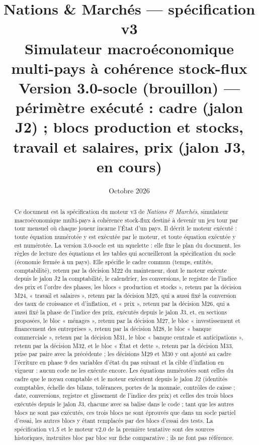 \documentclass[11pt,a4paper]{article}
\title{\textbf{Nations \& Marchés --- spécification v3}\\[4pt]
\large Simulateur macroéconomique multi-pays à cohérence stock-flux\\[2pt]
\normalsize Version 3.0-socle (brouillon) --- périmètre exécuté : cadre (jalon J2) ; blocs production et stocks, travail et salaires, prix (jalon J3, en cours)}
\author{}
\date{Octobre 2026}
\begin{document}
\maketitle

\begin{abstract}
\noindent Ce document est la spécification du moteur v3 de \emph{Nations \& Marchés}, simulateur macroéconomique multi-pays à cohérence stock-flux destiné à devenir un jeu tour par tour mensuel où chaque joueur incarne l'État d'un pays. Il décrit le moteur exécuté : toute équation numérotée y est exécutée par le moteur, et toute équation exécutée y est numérotée. La version 3.0-socle est un squelette : elle fixe le plan du document, les règles de lecture des équations et les tables qui accueilleront la spécification du socle (économie fermée à un pays). Elle spécifie le cadre commun (temps, entités, comptabilité), retenu par la décision M22 du mainteneur, dont le moteur exécute depuis le jalon J2 la comptabilité, le calendrier, les conversions, le registre de l'indice des prix et l'ordre des phases, les blocs « production et stocks », retenu par la décision M24, « travail et salaires », retenu par la décision M25, qui a aussi fixé la conversion des taux de croissance et d'inflation, et « prix », retenu par la décision M26, qui a aussi fixé la phase de l'indice des prix, exécutés depuis le jalon J3, et, en sections proposées, le bloc « ménages », retenu par la décision M27, le bloc « investissement et financement des entreprises », retenu par la décision M28, le bloc « banque commerciale », retenu par la décision M31, le bloc « banque centrale et anticipations », retenu par la décision M32, et le bloc « État et dette », retenu par la décision M33, prise par paire avec la précédente ; les décisions M29 et M30 y ont ajouté au cadre l'écriture en phase 9 des variables d'état du pas suivant et la cible d'inflation en vigueur : aucun code ne les exécute encore. Les équations numérotées sont celles du cadre que le noyau comptable et le moteur exécutent depuis le jalon J2 (identités comptables, échelle des bilans, tolérances, portes de la monnaie, contrôles de caisse ; date, conversions, registre et glissement de l'indice des prix) et celles des trois blocs exécutés depuis le jalon J3, chacune avec sa balise dans le code ; tant que les autres blocs ne sont pas exécutés, ces trois blocs ne sont éprouvés que dans un socle partiel d'essai, les autres blocs y étant remplacés par des blocs d'essai des tests. La spécification v1.5 et le moteur v2.0 de la première tentative sont des sources historiques, instruites bloc par bloc sur fiche comparative ; ils ne font pas référence.
\end{abstract}
\end{document}
